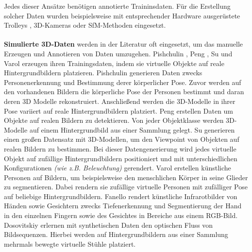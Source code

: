 Jedes dieser Ansätze benötigen annotierte Traininsdaten. Für die Erstellung solcher Daten wurden beispielsweise mit entsprechender Hardware ausgerüstete Trolleys \cite{huitlTUMindoorExtensiveImage2012}, 3D-Kameras \cite{izadiKinectFusionRealtime3D2011} oder SfM-Methoden \cite{kendallPoseNetConvolutionalNetwork2015} eingesetzt.
\\\\
\textbf{Simulierte 3D-Daten} werden in der Literatur oft eingesetzt, um das manuelle Erzeugen und Annotieren von Daten umzugehen. Pishchulin \etal\cite{pishchulinArticulatedPeopleDetection2012a}, Peng \etal\cite{pengLearningDeepObject2014}, Su \etal\cite{suRenderCNNViewpoint2015} und Varol \etal\cite{varolLearningSyntheticHumans2017} erzeugen ihren Trainingsdaten, indem sie virtuelle Objekte auf reale Hintergrundbildern platzieren. Pishchulin \etal\cite{pishchulinArticulatedPeopleDetection2012a} generieren Daten zwecks Personenerkennung und Bestimmung derer körperlicher Pose. Zuvor werden auf den vorhandenen Bildern die körperliche Pose der Personen bestimmt und daran deren 3D Modelle rekonstruiert. Anschließend werden die 3D-Modelle in ihrer Pose variiert auf reale Hintergrundbildern platziert. Peng \etal\cite{pengLearningDeepObject2014} erstellen Daten um Objekte auf realen Bildern zu detektieren. Von jeder Objektklasse werden 3D-Modelle auf einem Hintergrundbild aus einer Sammlung gelegt. Su \etal\cite{suRenderCNNViewpoint2015} generieren einen großen Datensatz mit 3D-Modellen, um den Viewpoint von Objekten auf realen Bildern zu bestimmen. Bei dieser Datengenerierung wird jedes virtuelle Objekt auf zufällige Hintergrundbildern positioniert und mit unterschiedlichen Konfigurationen \textit{(wie z.B. Beleuchtung)} gerendert. 
Varol \etal\cite{varolLearningSyntheticHumans2017} erstellen künstliche Personen auf Bildern, um beispielsweise den menschlichen Körper in seine Glieder zu segmentieren. Dabei rendern sie zufällige virtuelle Personen mit zufälliger Pose auf beliebige Hintergrundbildern.
Fanello \etal\cite{fanelloLearningBeDepth2014} rendert künstliche Infrarotbilder von Händen sowie Gesichtern zwecks Tiefenerkennung und Segmentierung der Hand in den einzelnen Fingern sowie des Gesichtes in Bereiche aus einem RGB-Bild.
Dosovitskiy \etal\cite{dosovitskiyFlowNetLearningOptical2015} erlernen mit synthetischen Daten den optischen Fluss von Bildsequenzen.  Hierbei werden auf Hintergrundbildern aus einer Sammlung mehrmals bewegte virtuelle Stühle platziert.

